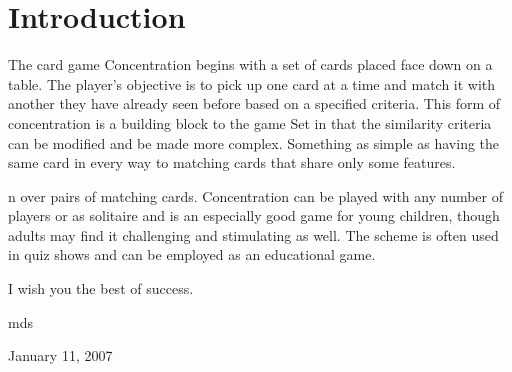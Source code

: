 \section{Introduction}

The card game Concentration begins with a set of cards placed face down on a table. The player's objective is to pick up one card at a time and match it with another they have already seen before based on a specified criteria. This form of concentration is a building block to the game Set in that the similarity criteria can be modified and be made more complex. Something as simple as having the same card in every way to matching cards that share only some features.

n over pairs of matching cards. Concentration can be played with any number of players or as solitaire and is an especially good game for young children, though adults may find it challenging and stimulating as well. The scheme is often used in quiz shows and can be employed as an educational game.

I wish you the best of success.

\hfill mds

\hfill January 11, 2007